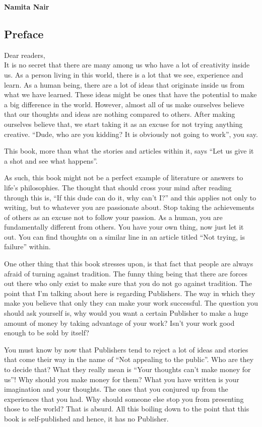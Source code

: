 \documentclass[twoside,11pt,titlepage]{article}
\begin{document}
\textbf{Namita Nair}
\newpage
\begin{center}
  \section{Preface}
\end{center}
Dear readers,\\

It is no secret that there are many among us who have a lot of creativity inside us. As a person living in this world, there is a lot that we see, experience and learn. As a human being, there are a lot of ideas that originate inside us from what we have learned. These ideas might be ones that have the potential to make a big difference in the world. However, almost all of us make ourselves believe that our thoughts and ideas are nothing compared to others. After making ourselves believe that, we start taking it as an excuse for not trying anything creative. ``Dude, who are you kidding? It is obviously not going to work'', you say.

This book, more than what the stories and articles within it, says ``Let us give it a shot and see what happens''.

As such, this book might not be a perfect example of literature or answers to life's philosophies. The thought that should cross your mind after reading through this is, ``If this dude can do it, why can't I?'' and this applies not only to writing, but to whatever you are passionate about. Stop taking the achievements of others as an excuse not to follow your passion. As a human, you are fundamentally different from others. You have your own thing, now just let it out. You can find thoughts on a similar line in an article titled ``Not trying, is failure'' within.

One other thing that this book stresses upon, is that fact that people are always afraid of turning against tradition. The funny thing being that there are forces out there who only exist to make sure that you do not go against tradition. The point that I'm talking about here is regarding Publishers. The way in which they make you believe that only they can make your work successful. The question you should ask yourself is, why would you want a certain Publisher to make a huge amount of money by taking advantage of your work? Isn't your work good enough to be sold by itself? 

You must know by now that Publishers tend to reject a lot of ideas and stories that come their way in the name of ``Not appealing to the public''. Who are they to decide that? What they really mean is ``Your thoughts can't make money for us''! Why should you make money for them? What you have written is your imagination and your thoughts. The ones that you conjured up from the experiences that you had. Why should someone else stop you from presenting those to the world? That is absurd. All this boiling down to the point that this book is self-published and hence, it has no Publisher.
\end{document}
